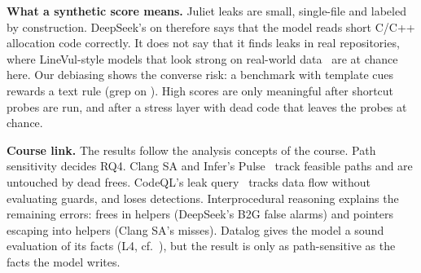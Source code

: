 \textbf{What a synthetic score means.}
Juliet leaks are small, single-file and labeled by construction.
DeepSeek's  on \Deb{} therefore says that the model reads short C/C++ allocation code correctly.
It does not say that it finds leaks in real repositories, where LineVul-style models that look strong on real-world data~\cite{fu2022linevul}
are at chance here.
Our debiasing shows the converse risk: a benchmark with template cues rewards a text rule (grep  on \Orig).
High scores are only meaningful after shortcut probes are run, and after a stress layer with dead code that leaves the probes at chance.

\textbf{Course link.}
The results follow the analysis concepts of the course.
Path sensitivity decides RQ4.
Clang SA and Infer's Pulse~\cite{le2022pulse} track feasible paths and are untouched by dead frees.
CodeQL's leak query~\cite{avgustinov2016ql} tracks data flow without evaluating guards, and loses  detections.
Interprocedural reasoning explains the remaining errors: frees in helpers (DeepSeek's B2G false alarms) and pointers escaping into helpers (Clang SA's misses).
Datalog gives the model a sound evaluation of its facts (L4, cf.~\cite{jordan2016souffle}),
but the result is only as path-sensitive as the facts the model writes.
